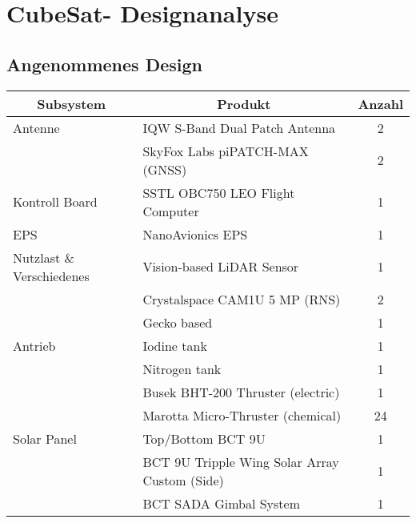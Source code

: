 		\section{CubeSat- Designanalyse}
				\subsection{Angenommenes Design}
				
				\begin{table}[]
\begin{tabular}{|l|l|c|}
\hline
\multicolumn{1}{|c|}{Subsystem} & \multicolumn{1}{c|}{Produkt}    	            & Anzahl \\ \hline
Antenne                         & IQW S-Band Dual Patch Antenna                 & 2      \\ \hline
                                & SkyFox Labs piPATCH-MAX (GNSS)                & 2      \\ \hline
Kontroll Board                  & SSTL OBC750 LEO Flight Computer               & 1      \\ \hline
EPS                             & NanoAvionics EPS                              & 1      \\ \hline
Nutzlast \& Verschiedenes       & Vision-based LiDAR Sensor                     & 1      \\ \hline
                                & Crystalspace CAM1U 5 MP (RNS)                 & 2      \\ \hline
                                & Gecko based                                   & 1      \\ \hline
Antrieb                         & Iodine tank                                   & 1      \\ \hline
                                & Nitrogen tank                                 & 1      \\ \hline
                                & Busek BHT-200 Thruster (electric)             & 1      \\ \hline
                                & Marotta Micro-Thruster (chemical)             & 24     \\ \hline
Solar Panel                     & Top/Bottom BCT 9U                             & 1      \\ \hline
                                & BCT 9U Tripple Wing Solar Array Custom (Side) & 1      \\ \hline
                                & BCT SADA Gimbal System                        & 1      \\ \hline

\end{tabular}
\end{table}
